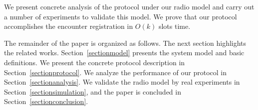 We present concrete analysis of the protocol under our radio model
and carry out a number of experiments to validate this model.
We prove that our protocol accomplishes the encounter registration in $O(k)$ slots time.


The remainder of the paper is organized as follows. 
The next section highlights the related works.
Section~\ref{sectionmodel} presents the system model and basic definitions.
We present the concrete protocol description
in Section~\ref{sectionprotocol}. We  
analyze the performance of our protocol in Section~\ref{sectionanalysis}. 
We validate the radio model by real experiments in Section~\ref{sectionsimulation}, 
and the paper is concluded in Section~\ref{sectionconclusion}.